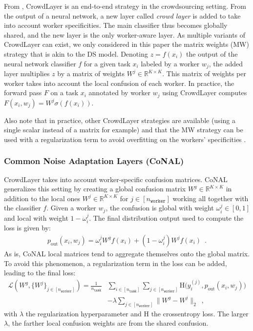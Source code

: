 From \citet{rodrigues2018deep}, CrowdLayer is an end-to-end strategy in the crowdsourcing setting.
From the output of a neural network, a new layer called \emph{crowd layer} is added to take into account worker specificities.
The main classifier thus becomes globally shared, and the new layer is the only worker-aware layer.
As multiple variants of CrowdLayer can exist, we only considered in this paper the matrix weights (MW) strategy that is akin to the DS model.
Denoting $z=f(x_i)$ the output of the neural network classifier $f$ for a given task $x_i$ labeled by a worker $w_j$, the added layer multiplies $z$ by a matrix of weights $W^j \in\mathbb{R}^{K\times K}$.
This matrix of weights per worker takes into account the local confusion of each worker.
In practice, the forward pass $F$ on a task $x_i$ annotated by worker $w_j$ using CrowdLayer computes $F(x_i, w_j) = W^j\sigma(f(x_i))$.

Also note that in practice, other CrowdLayer strategies are available (using a single scalar instead of a matrix for example) and that the MW strategy can be used with a regularization term to avoid overfitting on the workers' specificities \citep{tanoreg}.

\subsubsection{Common Noise Adaptation Layers (CoNAL)}
\label{subsec:conal}

CrowdLayer takes into account worker-specific confusion matrices.
CoNAL \citep{chu2021learning} generalizes this setting by creating a global confusion matrix $W^g\in\mathbb{R}^{K\times K}$ in addition to the local ones $W^j\in\mathbb{R}^{K\times K}$ for $j\in[n_{\texttt{worker}}]$ working all together with the classifier $f$.
Given a worker $w_j$, the confusion is global with weight $\omega_i^j\in [0,1]$ and local with weight $1-\omega_i^j$.
The final distribution output used to compute the loss is given by:
\begin{align*}
    p_{\text{out}}(x_i, w_j) = \omega _i^j W^g f(x_i) + (1-\omega_i^j)W^j f(x_i) \enspace.
\end{align*}
As is, CoNAL local matrices tend to aggregate themselves onto the global matrix.
To avoid this phenomenon, a regularization term in the loss can be added, leading to the final loss:
\begin{align*}
    \mathcal{L}(W^g, \{W^j\}_{j\in [n_\texttt{worker}]}) = \frac{1}{n_\texttt{task}} &\sum_{i\in [n_\texttt{task}]}\sum_{j\in [n_\texttt{worker}]} \mathrm{H}\Big(y_i^{(j)}, p_{\text{out}}(x_i, w_j)\Big) \\ &- \lambda \sum_{j\in [n_\texttt{worker}]} \| W^g - W^j\|_2 \enspace,
\end{align*}
with $\lambda$ the regularization hyperparameter and $\mathrm{H}$ the crossentropy loss. The larger $\lambda$, the farther local confusion weights are from the shared confusion.

